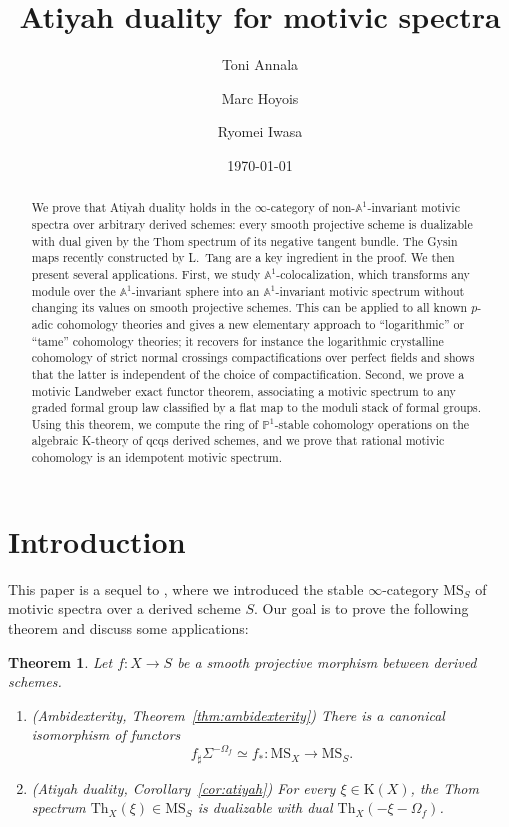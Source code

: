 \documentclass{amsart}
\title{Atiyah duality for motivic spectra}
\date{\today}
\author{Toni Annala}
\author{Marc Hoyois}
\author{Ryomei Iwasa}
\numberwithin{equation}{section}
\theoremstyle{plain}
\newtheorem{theorem}[equation]{Theorem}
\theoremstyle{definition}
\let\bb=\mathbb
\def\A{\bb A}
\def\P{\bb P}
\def\Th{\mathrm{Th}}
\def\K{\mathrm{K}{}}
\def\MS{\mathrm{MS}}
\begin{document}
	
\maketitle

\begin{abstract}
	We prove that Atiyah duality holds in the $\infty$-category of non-$\A^1$-invariant motivic spectra over arbitrary derived schemes: every smooth projective scheme is dualizable with dual given by the Thom spectrum of its negative tangent bundle. The Gysin maps recently constructed by L.~Tang are a key ingredient in the proof. We then present several applications. First, we study $\A^1$-colocalization, which transforms any module over the $\A^1$-invariant sphere into an $\A^1$-invariant motivic spectrum without changing its values on smooth projective schemes. This can be applied to all known $p$-adic cohomology theories and gives a new elementary approach to ``logarithmic'' or ``tame'' cohomology theories; it recovers for instance the logarithmic crystalline cohomology of strict normal crossings compactifications over perfect fields and shows that the latter is independent of the choice of compactification. Second, we prove a motivic Landweber exact functor theorem, associating a motivic spectrum to any graded formal group law classified by a flat map to the moduli stack of formal groups. Using this theorem, we compute the ring of $\P^1$-stable cohomology operations on the algebraic K-theory of qcqs derived schemes, and we prove that rational motivic cohomology is an idempotent motivic spectrum.
\end{abstract}

\tableofcontents

\section{Introduction}

This paper is a sequel to \cite{AHI}, where we introduced the stable $\infty$-category $\MS_S$ of motivic spectra over a derived scheme $S$.
Our goal is to prove the following theorem and discuss some applications:

\begin{theorem}\label{thm:main-intro}
	Let $f\colon X\to S$ be a smooth projective morphism between derived schemes.
	\begin{enumerate}
		\item \textnormal{(Ambidexterity, Theorem~\ref{thm:ambidexterity})} There is a canonical isomorphism of functors
		\[
		f_\sharp\Sigma^{-\Omega_f} \simeq f_*\colon \MS_X\to \MS_S.
		\]
		\item \textnormal{(Atiyah duality, Corollary~\ref{cor:atiyah})} For every $\xi\in\K(X)$, the Thom spectrum $\Th_X(\xi)\in\MS_S$ is dualizable with dual $\Th_X(-\xi-\Omega_f)$.
	\end{enumerate}
\end{theorem}
\end{document}
